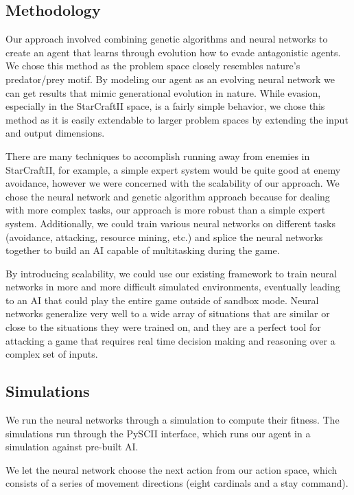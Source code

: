 \documentclass{article}
\begin{document}
\begin{multicols}{2}
\section{Methodology}
Our approach involved combining genetic algorithms and neural networks to
create an agent that learns through evolution how to evade antagonistic
agents. We chose this method as the problem space closely resembles nature's
predator/prey motif. By modeling our agent as an evolving neural network we can
get results that mimic generational evolution in nature. While evasion,
especially in the StarCraftII space, is a fairly simple behavior, we chose this
method as it is easily extendable to larger problem spaces by extending the
input and output dimensions.

There are many techniques to accomplish running away from enemies in
StarCraftII, for example, a simple expert system would be quite good at enemy
avoidance, however we were concerned with the scalability of our approach. We
chose the neural network and genetic algorithm approach because for dealing
with more complex tasks, our approach is more robust than a simple expert
system. Additionally, we could train various neural networks on different
tasks (avoidance, attacking, resource mining, etc.) and splice the neural
networks together to build an AI capable of multitasking during the game.

By introducing scalability, we could use our existing framework to train neural
networks in more and more difficult simulated environments, eventually leading
to an AI that could play the entire game outside of sandbox mode. Neural
networks generalize very well to a wide array of situations that are similar or
close to the situations they were trained on, and they are a perfect tool for
attacking a game that requires real time decision making and reasoning over a
complex set of inputs.

\subsection{Simulations}
We run the neural networks through a simulation to compute their fitness. The
simulations run through the PySCII interface, which runs our agent in a
simulation against pre-built AI.

We let the neural network choose the next action from our action space, which
consists of a series of movement directions (eight cardinals and a stay
command).


\end{multicols}
\end{document}
